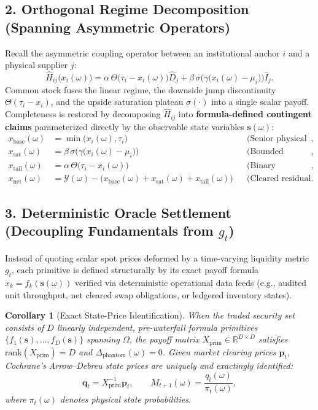 \documentclass[11pt]{article}
\newtheorem{corollary}{Corollary}
\begin{document}
\subsection{2. Orthogonal Regime Decomposition (Spanning Asymmetric Operators)}
Recall the asymmetric coupling operator between an institutional anchor $i$ and a physical supplier $j$:
\begin{equation}
    \hat{H}_{ij}\big(x_i(\omega)\big) = \alpha \, \Theta\big(\tau_i - x_i(\omega)\big) \hat{D}_j + \beta \, \sigma\Big(\gamma \big(x_i(\omega) - \mu_i\big)\Big) \hat{I}_j.
\end{equation}
Common stock fuses the linear regime, the downside jump discontinuity $\Theta(\tau_i - x_i)$, and the upside saturation plateau $\sigma(\cdot)$ into a single scalar payoff. Completeness is restored by decomposing $\hat{H}_{ij}$ into \textbf{formula-defined contingent claims} parameterized directly by the observable state variables $\bm{s}(\omega)$:
\begin{align}
    x_{\mathrm{base}}(\omega) &= \min\big(x_i(\omega), \tau_i\big) && \text{(Senior physical throughput claim)}, \\
    x_{\mathrm{sat}}(\omega)  &= \beta \, \sigma\Big(\gamma\big(x_i(\omega) - \mu_i\big)\Big) && \text{(Bounded capacity-ceiling claim)}, \\
    x_{\mathrm{tail}}(\omega) &= \alpha \, \Theta\big(\tau_i - x_i(\omega)\big) && \text{(Binary solvency-breach trigger)}, \\
    x_{\mathrm{net}}(\omega)  &= \mathcal{Y}(\omega) - \big(x_{\mathrm{base}}(\omega) + x_{\mathrm{sat}}(\omega) + x_{\mathrm{tail}}(\omega)\big) && \text{(Cleared residual systemic tranche)}.
\end{align}

\subsection{3. Deterministic Oracle Settlement (Decoupling Fundamentals from $g_t$)}
Instead of quoting scalar spot prices deformed by a time-varying liquidity metric $g_t$, each primitive is defined structurally by its exact payoff formula $x_k = f_k(\bm{s}(\omega))$ verified via deterministic operational data feeds (e.g., audited unit throughput, net cleared swap obligations, or ledgered inventory states).

\begin{corollary}[Exact State-Price Identification]
When the traded security set consists of $D$ linearly independent, pre-waterfall formula primitives $\{f_1(\bm{s}), \dots, f_D(\bm{s})\}$ spanning $\Omega$, the payoff matrix $X_{\mathrm{prim}} \in \mathbb{R}^{D \times D}$ satisfies $\mathrm{rank}(X_{\mathrm{prim}}) = D$ and $\Delta_{\mathrm{phantom}}(\omega) = 0$. Given market clearing prices $\bm{p}_t$, Cochrane's Arrow--Debreu state prices are uniquely and exactingly identified:
\begin{equation}
    \bm{q}_t = X_{\mathrm{prim}}^{-1} \bm{p}_t, \qquad M_{t+1}(\omega) = \frac{q_t(\omega)}{\pi_t(\omega)},
\end{equation}
where $\pi_t(\omega)$ denotes physical state probabilities.
\end{corollary}
\end{document}
